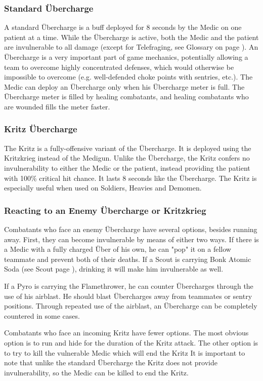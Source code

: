 \subsubsection{Standard Übercharge}
A standard Übercharge is a buff deployed for 8 seconds by the Medic on one patient at a time. While the Übercharge is active, both the Medic and the patient are invulnerable to all damage (except for Telefraging, see Glossary on page \pageref{Glossary}). An Übercharge is a very important part of game mechanics, potentially allowing a team to overcome highly concentrated defenses, which would otherwise be impossible to overcome (e.g. well-defended choke points with sentries, etc.). The Medic can deploy an Übercharge only when his Übercharge meter is full. The Übercharge meter is filled by healing combatants, and healing combatants who are wounded fills the meter faster.

\subsubsection{Kritz Übercharge}
The Kritz is a fully-offensive variant of the Übercharge. It is deployed using the Kritzkrieg instead of the Medigun. Unlike the Übercharge, the Kritz confers no invulnerability to either the Medic or the patient, instead providing the patient with 100\% critical hit chance. It lasts 8 seconds like the Übercharge. The Kritz is especially useful when used on Soldiers, Heavies and Demomen.  

\subsubsection{Reacting to an Enemy Übercharge or Kritzkrieg}
Combatants who face an enemy Übercharge have several options, besides running away. First, they can become invulnerable by means of either two ways. If there is a Medic with a fully charged Über of his own, he can "pop" it on a fellow teammate and prevent both of their deaths. If a Scout is carrying Bonk Atomic Soda (see Scout page \pageref{Scout}), drinking it will make him invulnerable as well.

If a Pyro is carrying the Flamethrower, he can counter Übercharges through the use of his airblast.  He should blast Übercharges away from teammates or sentry positions.  Through repeated use of the airblast, an Übercharge can be completely countered in some cases.

\newpage

Combatants who face an incoming Kritz have fewer options. The most obvious option is to run and hide for the duration of the Kritz attack. The other option is to try to kill the vulnerable Medic which will end the Kritz  It is important to note that unlike the standard Übercharge the Kritz does not provide invulnerability, so the Medic can be killed to end the Kritz.

